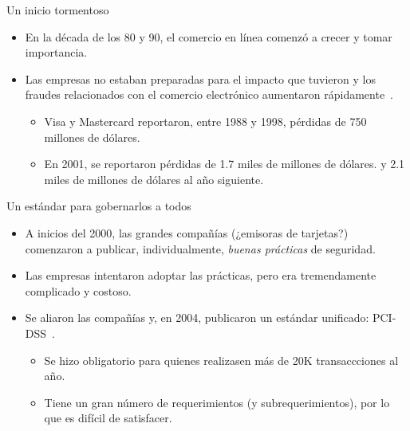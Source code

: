 %
%
%


\begin{frame}{Un inicio tormentoso}
  \begin{itemize}
    \item En la década de los 80 y 90, el comercio en línea comenzó a crecer y
      tomar importancia.
    \item Las empresas no estaban preparadas para el impacto que tuvieron y
      los fraudes relacionados con el comercio electrónico aumentaron
      rápidamente~\cite{search_security}.
      \begin{itemize}
        \item Visa y Mastercard reportaron, entre 1988 y 1998, pérdidas de 750
          millones de dólares.
        \item En 2001, se reportaron pérdidas de 1.7 miles de millones de
          dólares. y  2.1 miles de millones de dólares al año siguiente.
      \end{itemize}
  \end{itemize}
\end{frame}

\begin{frame}{Un estándar para gobernarlos a todos}
  \begin{itemize}
    \item A inicios del 2000, las grandes compañías (¿emisoras de tarjetas?)
      comenzaron a publicar, individualmente, \textit{buenas prácticas} de
      seguridad.
    \item Las empresas intentaron adoptar las prácticas, pero era tremendamente
      complicado y costoso.
    \item Se aliaron las compañías y, en 2004, publicaron un estándar unificado:
      PCI-DSS\footnotemark~\cite{pci_dss}.
      \begin{itemize}
        \item Se hizo obligatorio para quienes realizasen más de 20K
          transaccciones al año.
        \item Tiene un gran número de requerimientos (y subrequerimientos), por
          lo que es difícil de satisfacer.
      \end{itemize}
  \end{itemize}
\end{frame}

